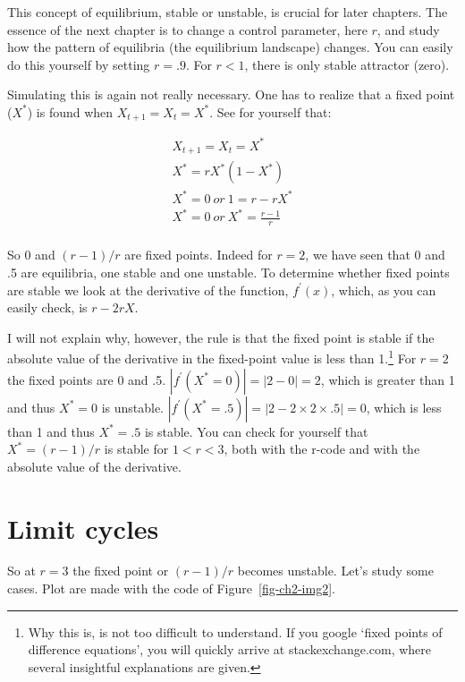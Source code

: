 \documentclass[
  a4paper,
  DIV=11,
  numbers=noendperiod]{scrreprt}
\begin{document}
This concept of equilibrium, stable or unstable, is crucial for later
chapters. The essence of the next chapter is to change a control
parameter, here \(r\), and study how the pattern of equilibria (the
equilibrium landscape) changes. You can easily do this yourself by
setting \(r = .9\). For \(r < 1\), there is only stable attractor
(zero).

Simulating this is again not really necessary. One has to realize that a
fixed point (\(X^{*}\)) is found when \(X_{t + 1} = X_{t} = X^{*}\). See
for yourself that:

\[
\begin{gathered}
X_{t + 1} = X_{t} = X^{*} \\
X^{*} = rX^{*}( 1 - X^{*}) \\
X^{*} = 0\ or\ 1 = r - rX^{*} \\
X^{*} = 0\ or\ X^{*} = \frac{r - 1}{r} \\
\end{gathered}
\]

So 0 and \((r - 1)/r\) are fixed points. Indeed for \(r = 2\), we have
seen that 0 and .5 are equilibria, one stable and one unstable. To
determine whether fixed points are stable we look at the derivative of
the function, \(f^{'}(x)\), which, as you can easily check, is
\(r - 2rX\).

I will not explain why, however, the rule is that the fixed point is
stable if the absolute value of the derivative in the fixed-point value
is less than 1.\footnote{Why this is, is not too difficult to
  understand. If you google `fixed points of difference equations', you
  will quickly arrive at stackexchange.com, where several insightful
  explanations are given.} For \(r = 2\) the fixed points are 0 and .5.
\(\left| f^{'}\left( X^{*} = 0 \right) \right| = |2 - 0| = 2\), which is
greater than 1 and thus \(X^{*} = 0\) is unstable.
\(\left| f^{'}\left( X^{*} = .5 \right) \right| = |2 - 2 \times 2 \times .5| = 0\),
which is less than 1 and thus \(X^{*} = .5\) is stable. You can check
for yourself that \(X^{*}=(r - 1)/r\) is stable for \(1 < r < 3\), both
with the r-code and with the absolute value of the derivative.

\hypertarget{sec-Limit-cycles}{%
\section{Limit cycles}\label{sec-Limit-cycles}}

So at \(r = 3\) the fixed point or \((r - 1)/r\) becomes unstable. Let's
study some cases. Plot are made with the code of
Figure~\ref{fig-ch2-img2}.
\end{document}
